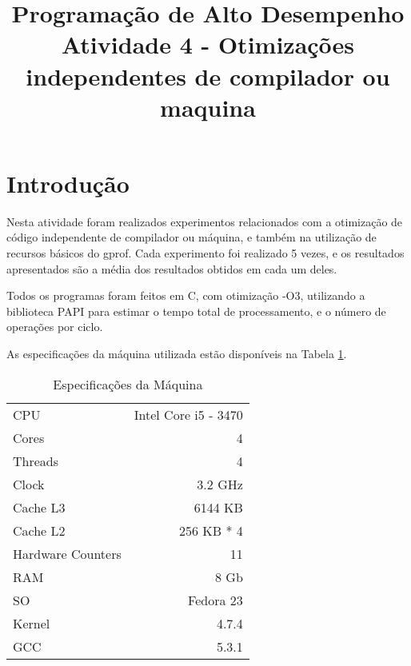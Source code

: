 \documentclass[conference]{IEEEtran}
\begin{document}
\title{Programação de Alto Desempenho\\
\large Atividade 4 - Otimizações independentes de compilador ou maquina}

\author{
 }

\maketitle


\section{Introdução}
Nesta atividade foram realizados experimentos relacionados com a otimização de código independente de compilador ou máquina, e também na utilização de recursos básicos do gprof.
Cada experimento foi realizado 5 vezes, e os resultados apresentados são a média dos resultados obtidos em cada um deles.

Todos os programas foram feitos em C, com otimização -O3, utilizando a biblioteca PAPI para estimar o tempo total de processamento, e o número de operações por ciclo.


As especificações da máquina utilizada estão disponíveis na Tabela \ref{tab:cpu}.

\begin{table}[htb!]
\centering
\caption{Especificações da Máquina}
\label{tab:cpu}
\begin{tabular}{lr}
 CPU & Intel Core i5 - 3470\\
 Cores & 4\\
 Threads & 4\\
 Clock & 3.2 GHz\\
 Cache L3 & 6144 KB \\
 Cache L2 & 256 KB * 4 \\
 Hardware Counters & 11 \\
 RAM & 8 Gb \\
 SO & Fedora 23 \\
 Kernel & 4.7.4 \\
 GCC & 5.3.1\\

\end{tabular}
\end{table}
\end{document}
